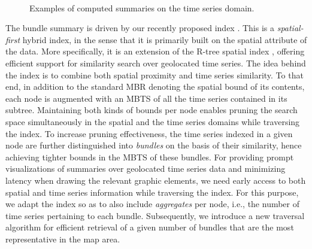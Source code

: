 \begin{figure}[!t]
 \centering
 \
\caption{Examples of computed summaries on the time series domain.}
\label{fig:examples2}
\end{figure}

The bundle summary is driven by our recently proposed {\em \btsr} index \cite{chatzig17btsr}. This is a {\em spatial-first} hybrid index, in the sense that it is primarily built on the spatial attribute of the data. More specifically, it is an extension of the R-tree spatial index \cite{Guttman1984}, offering efficient support for similarity search over geolocated time series. The idea behind the \btsr index is to combine both spatial proximity and time series similarity. To that end, in addition to the standard MBR denoting the spatial bound of its contents, each node is augmented with an MBTS of all the time series contained in its subtree. Maintaining both kinds of bounds per node enables pruning the search space simultaneously in the spatial and the time series domains while traversing the index. To increase pruning effectiveness, the time series indexed in a given node are further distinguished into {\em bundles} on the basis of their similarity, hence achieving tighter bounds in the MBTS of these bundles. For providing prompt visualizations of summaries over geolocated time series data and minimizing latency when drawing the relevant graphic elements, we need early access to both spatial and time series information while traversing the index. For this purpose, we adapt the \btsr index so as to also include {\em aggregates} per node, i.e., the number of time series pertaining to each bundle. Subsequently, we introduce a new traversal algorithm for efficient retrieval of a given number of bundles that are the most representative in the map area. 

